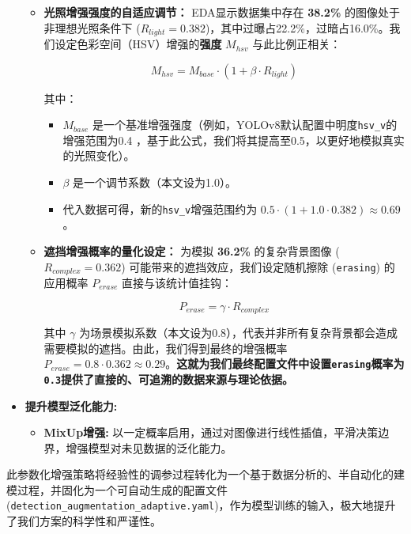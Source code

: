 \documentclass[
]{article}
\begin{document}
\begin{itemize}
  \begin{itemize}
  \item
    \textbf{光照增强强度的自适应调节：} EDA显示数据集中存在
    \textbf{38.2\%} 的图像处于非理想光照条件下
    (\(R_{light} = 0.382\))，其中过曝占22.2\%，过暗占16.0\%。我们设定色彩空间（HSV）增强的\textbf{强度}
    \(M_{hsv}\) 与此比例正相关：

    \[M_{hsv} = M_{base} \cdot (1 + \beta \cdot R_{light})\]

    其中：

    \begin{itemize}
    \item
      \(M_{base}\)
      是一个基准增强强度（例如，YOLOv8默认配置中明度\texttt{hsv\_v}的增强范围为0.4
      ，基于此公式，我们将其提高至0.5，以更好地模拟真实的光照变化）。
    \item
      \(\beta\) 是一个调节系数（本文设为1.0）。
    \item
      代入数据可得，新的\texttt{hsv\_v}增强范围约为
      \(0.5 \cdot (1 + 1.0 \cdot 0.382) \approx 0.69\)。
    \end{itemize}
  \item
    \textbf{遮挡增强概率的量化设定：} 为模拟 \textbf{36.2\%}
    的复杂背景图像 (\(R_{complex} = 0.362\))
    可能带来的遮挡效应，我们设定随机擦除 (\texttt{erasing}) 的应用概率
    \(P_{erase}\) 直接与该统计值挂钩：

    \[P_{erase} = \gamma \cdot R_{complex}\]

    其中 \(\gamma\)
    为场景模拟系数（本文设为0.8），代表并非所有复杂背景都会造成需要模拟的遮挡。由此，我们得到最终的增强概率
    \(P_{erase} = 0.8 \cdot 0.362 \approx 0.29\)。\textbf{这就为我们最终配置文件中设置\texttt{erasing}概率为\texttt{0.3}提供了直接的、可追溯的数据来源与理论依据。}
  \end{itemize}
\item
  \textbf{提升模型泛化能力:}

  \begin{itemize}
  \item
    \textbf{MixUp增强:}
    以一定概率启用，通过对图像进行线性插值，平滑决策边界，增强模型对未见数据的泛化能力。
  \end{itemize}
\end{itemize}

此参数化增强策略将经验性的调参过程转化为一个基于数据分析的、半自动化的建模过程，并固化为一个可自动生成的配置文件(\texttt{detection\_augmentation\_adaptive.yaml})，作为模型训练的输入，极大地提升了我们方案的科学性和严谨性。
\end{document}
